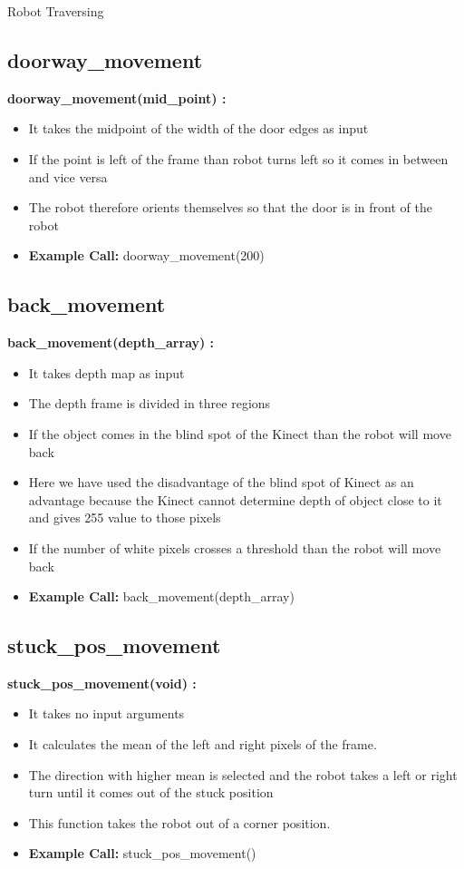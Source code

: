 \documentclass[10pt, a4paper]{beamer}
\begin{document}
\begin{frame}[allowframebreaks]{Robot Traversing}
  \subsection{doorway\_movement}
    \textbf{doorway\_movement(mid\_point) : }
      \begin{itemize}
       \item It takes the midpoint of the width of the door edges as input
       \item If the point is left of the frame than robot turns left so it comes in between and vice versa
       \item The robot therefore orients themselves so that the door is in front of the robot
       \item \textbf{Example Call:} doorway\_movement(200)
      \end{itemize}
  \framebreak
  \subsection{back\_movement}
    \textbf{back\_movement(depth\_array) : }
      \begin{itemize}
       \item It takes depth map as input
       \item The depth frame is divided in three regions
       \item If the object comes in the blind spot of the Kinect than the robot will move back
       \item Here we have used the disadvantage of the blind spot of Kinect as an advantage because the Kinect cannot determine depth of object close to it and gives 255 value to those pixels
       \item If the number of white pixels crosses a threshold than the robot will move back
       \item \textbf{Example Call:} back\_movement(depth\_array)
      \end{itemize}
   \framebreak
  \subsection{stuck\_pos\_movement}
    \textbf{stuck\_pos\_movement(void) : }
      \begin{itemize}
       \item It takes no input arguments
       \item It calculates the mean of the left and right pixels of the frame. 
       \item The direction with higher mean is selected and the robot takes a left or right turn until it comes out of the stuck position
       \item This function takes the robot out of a corner position.
       \item \textbf{Example Call:} stuck\_pos\_movement()
      \end{itemize}
  \framebreak

\end{frame}
\end{document}
